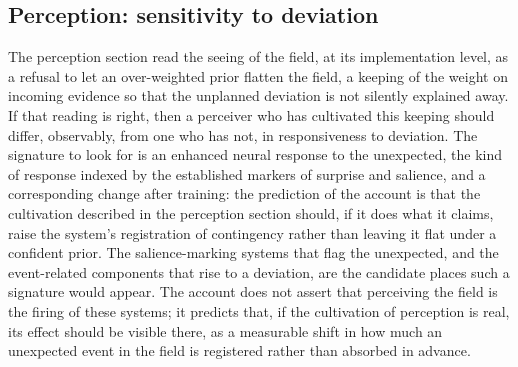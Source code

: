 \subsection{Perception: sensitivity to deviation}
\label{p22:sub:neuro-perception}

The perception section read the seeing of the field, at its implementation level, as a refusal to let an over-weighted prior flatten the field, a keeping of the weight on incoming evidence so that the unplanned deviation is not silently explained away. If that reading is right, then a perceiver who has cultivated this keeping should differ, observably, from one who has not, in responsiveness to deviation. The signature to look for is an enhanced neural response to the unexpected, the kind of response indexed by the established markers of surprise and salience, and a corresponding change after training: the prediction of the account is that the cultivation described in the perception section should, if it does what it claims, raise the system's registration of contingency rather than leaving it flat under a confident prior. The salience-marking systems that flag the unexpected, and the event-related components that rise to a deviation, are the candidate places such a signature would appear. The account does not assert that perceiving the field is the firing of these systems; it predicts that, if the cultivation of perception is real, its effect should be visible there, as a measurable shift in how much an unexpected event in the field is registered rather than absorbed in advance.

